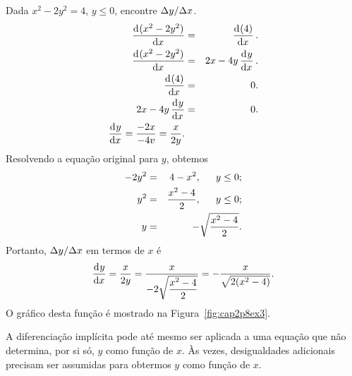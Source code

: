 \begin{example}
Dada $x^2 - 2y^2 = 4$, $y \le 0$, encontre $\Delta{y}/\Delta{x}$.
\begin{eqnarray*}
  \dod{(x^2 - 2y^2)}{x} & = & \dod{(4)}{x}. \\
  \dod{(x^2 - 2y^2)}{x} & = & 2x - 4y \dod y x. \\
  \dod{(4)}{x} & = & 0. \\
  2x - 4y \dod y x & = & 0. \\
  \dod y x = \frac{-2x}{-4v} = \frac{x}{2y}.
\end{eqnarray*}
Resolvendo a equação original para $y$, obtemos
\begin{eqnarray*}
  -2y^2 & = & 4 - x^2, \hspace{1.5em} y \le 0; \\
  y^2 & = & \frac{x^2 - 4}{2}, \hspace{1.5em} y \le 0; \\
  y & = & -\sqrt{\frac{x^2 - 4}{2}}.
\end{eqnarray*}
Portanto, $\Delta{y}/\Delta{x}$ em termos de $x$ é
$$
  \dod y x = \frac{x}{2y} = \frac{x}{-2\sqrt{\dfrac{x^2-4}{2}}} =
  - \frac{x}{\sqrt{2(x^2 - 4)}}.
$$
O gráfico desta função é mostrado na Figura~\ref{fig:cap2p8ex3}.
\end{example}


A diferenciação implícita pode até mesmo ser aplicada a uma equação que não
determina, por si só, $y$ como função de $x$. Às vezes, desigualdades
adicionais precisam ser assumidas para obtermos $y$ como função de $x$.

